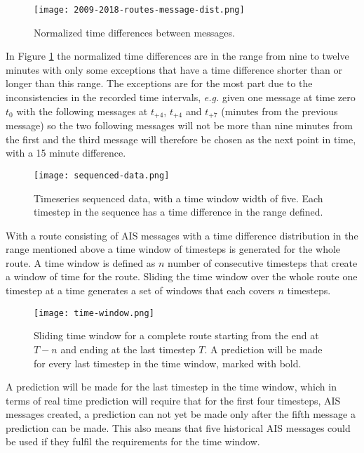 \documentclass[../main.tex]{subfiles}
\begin{document}
\begin{figure}[H]
	\centering
	\texttt{[image: 2009-2018-routes-message-dist.png]}
	\caption{Normalized time differences between messages.}
	\label{fig:norm-time}
\end{figure}

In Figure \ref{fig:norm-time} the normalized time differences are in the range from nine to twelve minutes with only some exceptions that have a time difference shorter than or longer than this range. The exceptions are for the most part due to the inconsistencies in the recorded time intervals, \textit{e.g.} given one message at time zero $t_0$ with the following messages at $t_{+4}$, $t_{+4}$ and $t_{+7}$ (minutes from the previous message) so the two following messages will not be more than nine minutes from the first and the third message will therefore be chosen as the next point in time, with a 15 minute difference. 

\begin{figure}[H]
	\centering
	\texttt{[image: sequenced-data.png]}
	\caption{Timeseries sequenced data, with a time window width of five. Each timestep in the sequence has a time difference in the range defined.}
	\label{fig:seq-data}
\end{figure}

With a route consisting of AIS messages with a time difference distribution in the range mentioned above a time window of timesteps is generated for the whole route. A time window is defined as $n$ number of consecutive timesteps that create a window of time for the route. Sliding the time window over the whole route one timestep at a time generates a set of windows that each covers $n$ timesteps. 

\begin{figure}[H]
	\centering
	\texttt{[image: time-window.png]}
	\caption{Sliding time window for a complete route starting from the end at $T-n$ and ending at the last timestep $T$. A prediction will be made for every last timestep in the time window, marked with bold.}
	\label{fig:time-window}
\end{figure}

A prediction will be made for the last timestep in the time window, which in terms of real time prediction will require that for the first four timesteps, AIS messages created, a prediction can not yet be made only after the fifth message a prediction can be made. This also means that five historical AIS messages could be used if they fulfil the requirements for the time window.
\end{document}
